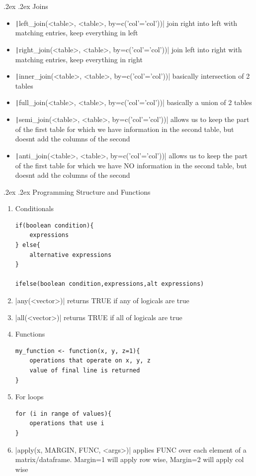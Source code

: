\documentclass[landscape,a4paper]{article}
\makeatletter
\renewcommand{\section}{\@startsection{section}{1}{0mm}%
	{.2ex}%
	{.2ex}%
	{\color{myblue}\sffamily\scriptsize\bfseries}}
\renewcommand{\subsection}{\@startsection{subsection}{1}{0mm}%
	{.2ex}%
	{.2ex}%
	{\sffamily\bfseries}}
\makeatother
\begin{document}
\begin{multicols*}{4}
		\subsection{Joins}
		\begin{itemize}
			\item \texttt|left_join(<table>, <table>, by=c('col'='col'))| join right into left with matching entries, keep everything in left
			\item \texttt|right_join(<table>, <table>, by=c('col'='col'))| join left into right with matching entries, keep everything in right
			\item \texttt|inner_join(<table>, <table>, by=c('col'='col'))| basically intersection of 2 tables
			\item \texttt|full_join(<table>, <table>, by=c('col'='col'))| basically a union of 2 tables
			\item \texttt|semi_join(<table>, <table>, by=c('col'='col'))| allows us to keep the part of the first table for which we have information in the second table, but doesnt add the columns of the second
			\item \texttt|anti_join(<table>, <table>, by=c('col'='col'))| allows us to keep the part of the first table for which we have NO information in the second table, but doesnt add the columns of the second
		\end{itemize}
		\section{Programming Structure and Functions}
		\begin{enumerate}
			\item Conditionals
			\begin{verbatim}
if(boolean condition){
    expressions
} else{
    alternative expressions
}

ifelse(boolean condition,expressions,alt expressions)
			\end{verbatim}
			\item {}|any(<vector>)| returns TRUE if any of logicals are true
            \item {}|all(<vector>)| returns TRUE if all of logicals are true
            \item Functions
            \begin{verbatim}
my_function <- function(x, y, z=1){
    operations that operate on x, y, z
    value of final line is returned
}
            \end{verbatim}
            \item For loops
            \begin{verbatim}
for (i in range of values){
    operations that use i
}
            \end{verbatim}
            \item {}|apply(x, MARGIN, FUNC, <args>)| applies FUNC over each element of a matrix/dataframe. Margin=1 will apply row wise, Margin=2 will apply col wise
		\end{enumerate}
	\end{multicols*}
\end{document}
